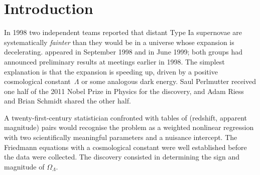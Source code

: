 \documentclass[12pt]{article}
\begin{document}
\begin{abstract}
I read the episode in the language of machine learning.  The Friedmann
equations supplied the hypothesis class.  The Phillips width--luminosity
relation supplied the feature that made the signal visible, as Lenard's
finding that frequency rather than intensity governs photoemission supplied
Einstein's.  A deep network given the same data recovers neither the density
parameters nor their meaning.  The supernovae measure one function,
$d_L(z)$, and every theory reproducing it remains standing: theory reduces the
sample size that data must supply, and theory also names the measurement that
discriminates.
\end{abstract}
%
%
\section{Introduction}

In 1998 two independent teams reported that distant Type Ia supernovae are
systematically \emph{fainter} than they would be in a universe whose
expansion is decelerating.  \citet{Riess1998} appeared in September 1998 and
\citet{Perlmutter1999} in June 1999; both groups had announced preliminary
results at meetings earlier in 1998.  The simplest explanation is that the
expansion is speeding up, driven by a positive cosmological
constant~$\Lambda$ or some analogous dark energy.  Saul Perlmutter received
one half of the 2011 Nobel Prize in Physics for the discovery, and Adam Riess
and Brian Schmidt shared the other half.

A twenty-first-century statistician confronted with tables of
(redshift, apparent magnitude) pairs would recognise the problem as a
weighted nonlinear regression with two scientifically meaningful
parameters and a nuisance intercept.  The Friedmann equations with a
cosmological constant were well established before the data were collected.
The discovery consisted in determining the sign and magnitude of
$\Omega_\Lambda$.
\end{document}
